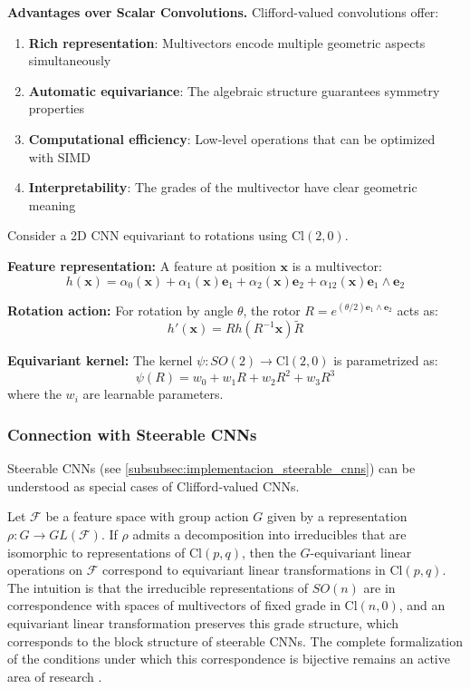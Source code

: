 \textbf{Advantages over Scalar Convolutions.}\label{rem:ventajas_clifford_conv} Clifford-valued convolutions offer:
\begin{enumerate}
    \item \textbf{Rich representation}: Multivectors encode multiple geometric aspects simultaneously
    \item \textbf{Automatic equivariance}: The algebraic structure guarantees symmetry properties
    \item \textbf{Computational efficiency}: Low-level operations that can be optimized with SIMD
    \item \textbf{Interpretability}: The grades of the multivector have clear geometric meaning
\end{enumerate}

\begin{example}\label{ex:steerable_clifford}
Consider a 2D CNN equivariant to rotations using $\text{Cl}(2,0)$.

\textbf{Feature representation:}
A feature at position $\mathbf{x}$ is a multivector:
\[h(\mathbf{x}) = \alpha_0(\mathbf{x}) + \alpha_1(\mathbf{x}) \mathbf{e}_1 + \alpha_2(\mathbf{x}) \mathbf{e}_2 + \alpha_{12}(\mathbf{x}) \mathbf{e}_1 \wedge \mathbf{e}_2\]

\textbf{Rotation action:}
For rotation by angle $\theta$, the rotor $R = e^{(\theta/2)\mathbf{e}_1 \wedge \mathbf{e}_2}$ acts as:
\[h'(\mathbf{x}) = R h(R^{-1} \mathbf{x}) \widetilde{R}\]

\textbf{Equivariant kernel:}
The kernel $\psi: SO(2) \to \text{Cl}(2,0)$ is parametrized as:
\[\psi(R) = w_0 + w_1 R + w_2 R^2 + w_3 R^3\]
where the $w_i$ are learnable parameters.
\end{example}

\subsubsection{Connection with Steerable CNNs}

Steerable CNNs (see \autoref{subsubsec:implementacion_steerable_cnns}) can be understood as special cases of Clifford-valued CNNs.

\begin{remark}\label{thm:equiv_steerable_clifford}
Let $\mathcal{F}$ be a feature space with group action $G$ given by a representation $\rho: G \to GL(\mathcal{F})$. If $\rho$ admits a decomposition into irreducibles that are isomorphic to representations of $\text{Cl}(p,q)$, then the $G$-equivariant linear operations on $\mathcal{F}$ correspond to equivariant linear transformations in $\text{Cl}(p,q)$. The intuition is that the irreducible representations of $SO(n)$ are in correspondence with spaces of multivectors of fixed grade in $\text{Cl}(n,0)$, and an equivariant linear transformation preserves this grade structure, which corresponds to the block structure of steerable CNNs. The complete formalization of the conditions under which this correspondence is bijective remains an active area of research \citep{brehmer2023geometric}.
\end{remark}

